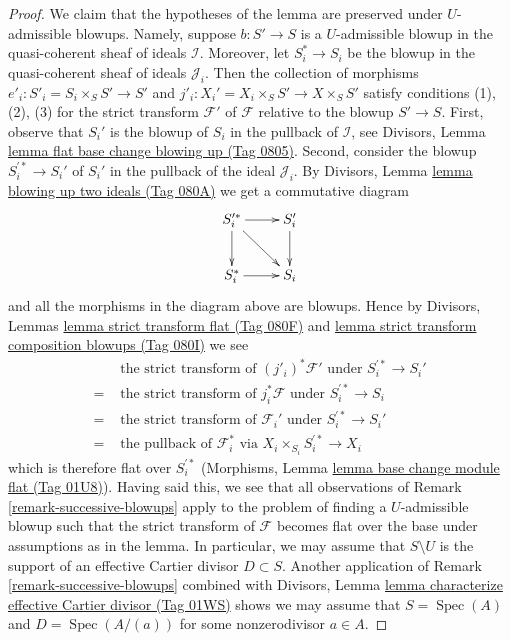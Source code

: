 \documentclass{amsart}
\theoremstyle{plain}
\theoremstyle{definition}
\theoremstyle{remark}
\numberwithin{equation}{subsection}
\def\Spec{\mathop{\mathrm{Spec}}}
\begin{document}
\begin{proof}
We claim that the hypotheses of the lemma are preserved under $U$-admissible
blowups. Namely, suppose $b : S' \to S$ is a $U$-admissible blowup in
the quasi-coherent sheaf of ideals $\mathcal{I}$. Moreover, let $S^*_i \to S_i$
be the blowup in the quasi-coherent sheaf of ideals $\mathcal{J}_i$.
Then the collection of morphisms $e'_i : S'_i = S_i \times_S S' \to S'$
and $j'_i : X_i' = X_i \times_S S' \to X \times_S S'$ satisfy conditions
(1), (2), (3) for the strict transform $\mathcal{F}'$ of $\mathcal{F}$
relative to the blowup $S' \to S$. First, observe that $S_i'$ is the
blowup of $S_i$ in the pullback of $\mathcal{I}$, see
Divisors, Lemma \href{https://stacks.math.columbia.edu/tag/0805}{lemma flat base change blowing up (Tag 0805)}.
Second, consider the blowup
$S_i^{\prime *} \to S_i'$ of $S_i'$ in the pullback of the ideal
$\mathcal{J}_i$.
By Divisors, Lemma \href{https://stacks.math.columbia.edu/tag/080A}{lemma blowing up two ideals (Tag 080A)}
we get a commutative diagram
$$
\xymatrix{
S_i^{\prime *} \ar[r] \ar[rd] \ar[d] & S'_i \ar[d] \\
S_i^* \ar[r] & S_i
}
$$
and all the morphisms in the diagram above are blowups. Hence by
Divisors, Lemmas \href{https://stacks.math.columbia.edu/tag/080F}{lemma strict transform flat (Tag 080F)} and
\href{https://stacks.math.columbia.edu/tag/080I}{lemma strict transform composition blowups (Tag 080I)}
we see
\begin{align*}
& \text{ the strict transform of }(j'_i)^*\mathcal{F}'\text{ under }
S_i^{\prime *} \to S_i' \\
= &
\text{ the strict transform of }j_i^*\mathcal{F}\text{ under }
S_i^{\prime *} \to S_i \\
= &
\text{ the strict transform of }\mathcal{F}_i'\text{ under }
S_i^{\prime *} \to S_i' \\
= &
\text{ the pullback of }\mathcal{F}_i^*\text{ via }
X_i \times_{S_i} S_i^{\prime *} \to X_i
\end{align*}
which is therefore flat over $S_i^{\prime *}$
(Morphisms, Lemma \href{https://stacks.math.columbia.edu/tag/01U8}{lemma base change module flat (Tag 01U8)}).
Having said this, we see that all observations of
Remark \ref{remark-successive-blowups} apply to the
problem of finding a $U$-admissible blowup such that the
strict transform of $\mathcal{F}$ becomes flat over the base
under assumptions as in the lemma. In particular, we may assume
that $S \setminus U$ is the support of an effective Cartier divisor
$D \subset S$. Another application of Remark \ref{remark-successive-blowups}
combined with
Divisors, Lemma \href{https://stacks.math.columbia.edu/tag/01WS}{lemma characterize effective Cartier divisor (Tag 01WS)}
shows we may assume that $S = \Spec(A)$ and $D = \Spec(A/(a))$
for some nonzerodivisor $a \in A$.


\end{proof}
\end{document}
